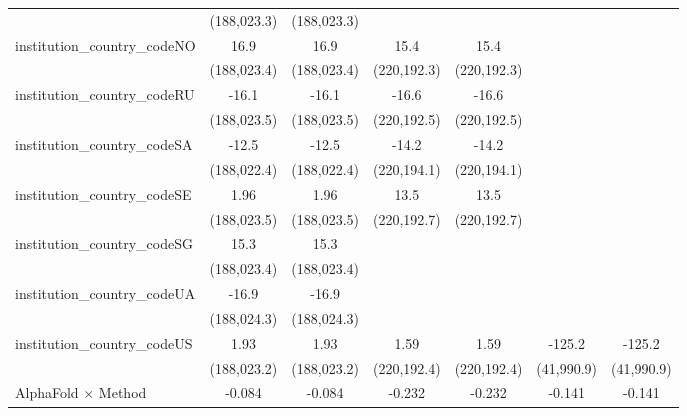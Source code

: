 \begin{tabular}{lcccccc}
                                         & (188,023.3)   & (188,023.3)   &               &               &              &   \\   
   institution\_country\_codeNO          & 16.9          & 16.9          & 15.4          & 15.4          &              &   \\   
                                         & (188,023.4)   & (188,023.4)   & (220,192.3)   & (220,192.3)   &              &   \\   
   institution\_country\_codeRU          & -16.1         & -16.1         & -16.6         & -16.6         &              &   \\   
                                         & (188,023.5)   & (188,023.5)   & (220,192.5)   & (220,192.5)   &              &   \\   
   institution\_country\_codeSA          & -12.5         & -12.5         & -14.2         & -14.2         &              &   \\   
                                         & (188,022.4)   & (188,022.4)   & (220,194.1)   & (220,194.1)   &              &   \\   
   institution\_country\_codeSE          & 1.96          & 1.96          & 13.5          & 13.5          &              &   \\   
                                         & (188,023.5)   & (188,023.5)   & (220,192.7)   & (220,192.7)   &              &   \\   
   institution\_country\_codeSG          & 15.3          & 15.3          &               &               &              &   \\   
                                         & (188,023.4)   & (188,023.4)   &               &               &              &   \\   
   institution\_country\_codeUA          & -16.9         & -16.9         &               &               &              &   \\   
                                         & (188,024.3)   & (188,024.3)   &               &               &              &   \\   
   institution\_country\_codeUS          & 1.93          & 1.93          & 1.59          & 1.59          & -125.2       & -125.2\\   
                                         & (188,023.2)   & (188,023.2)   & (220,192.4)   & (220,192.4)   & (41,990.9)   & (41,990.9)\\   
   AlphaFold $\times$ Method             & -0.084        & -0.084        & -0.232        & -0.232        & -0.141       & -0.141\\   

\end{tabular}
